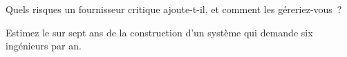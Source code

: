 \begin{interviewq}\label{iq:fm:build-against-buy:5}
Quels risques un fournisseur critique ajoute-t-il, et comment les géreriez-vous~?
\end{interviewq}

\begin{interviewq}\label{iq:fm:build-against-buy:6}
Estimez le  sur sept ans de la construction d'un système qui demande six ingénieurs par an.
\end{interviewq}
